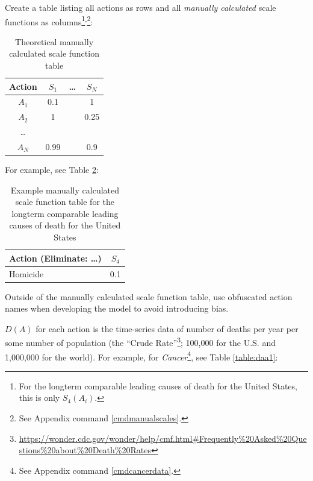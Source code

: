 \documentclass[10pt, a4paper, twocolumn]{IEEEconf}
\begin{document}
Create a table listing all actions as rows and all \textit{manually calculated} scale functions as columns\footnote{For the longterm comparable leading causes of death for the United States, this is only $S_4(A_i)$.}\textsuperscript{,}\footnote{See Appendix command \ref{cmdmanualscales}.}:

\begin{table}[H]
  \centering
  \begin{tabular}{cccc}
    \toprule
      Action & $S_1$  & \ldots & $S_N$  \\
    \midrule
      $A_1$  & 0.1    &        & 1      \\
      $A_2$  & 1      &        & 0.25   \\
      \ldots &        &        &        \\
      $A_N$  & 0.99   &        & 0.9    \\
    \bottomrule
  \end{tabular}
  \caption{Theoretical manually calculated scale function table}
  \label{table:scaletable}
\end{table}

For example, see Table \ref{table:exscaletable}:

\begin{table}[H]
  \centering
  \begin{tabular}{lc}
    \toprule
      Action (Eliminate: \ldots) & $S_4$ \\
    \midrule
      Homicide                   & 0.1   \\
    \bottomrule
  \end{tabular}
  \caption{Example manually calculated scale function table for the longterm comparable leading causes of death for the United States}
  \label{table:exscaletable}
\end{table}

Outside of the manually calculated scale function table, use obfuscated action names when developing the model to avoid introducing bias.

$D(A)$ for each action is the time-series data of number of deaths per year per some number of population (the \enquote{Crude Rate}\footnote{\scriptsize{\url{https://wonder.cdc.gov/wonder/help/cmf.html\#Frequently\%20Asked\%20Questions\%20about\%20Death\%20Rates}}}; 100,000 for the U.S. and 1,000,000 for the world).
For example, for \textit{Cancer}\footnote{See Appendix command \ref{cmdcancerdata}.}, see Table \ref{table:daa1}:
\end{document}
